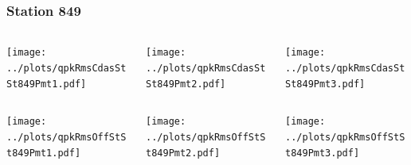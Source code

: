 \documentclass[aspectratio=169]{beamer}
\begin{document}
\begin{frame} 
  \frametitle{Station 849}
  \begin{center}
    \begin{columns}
      \begin{column}{0.33\textwidth}
        \texttt{[image: ../plots/qpkRmsCdasStSt849Pmt1.pdf]}
      \end{column}
      \begin{column}{0.33\textwidth}
        \texttt{[image: ../plots/qpkRmsCdasStSt849Pmt2.pdf]}
      \end{column}
      \begin{column}{0.33\textwidth}
        \texttt{[image: ../plots/qpkRmsCdasStSt849Pmt3.pdf]}
      \end{column}
    \end{columns}
  \end{center}

  \begin{center}
    \begin{columns}
      \begin{column}{0.33\textwidth}
        \texttt{[image: ../plots/qpkRmsOffStSt849Pmt1.pdf]}
      \end{column}
      \begin{column}{0.33\textwidth}
        \texttt{[image: ../plots/qpkRmsOffStSt849Pmt2.pdf]}
      \end{column}
      \begin{column}{0.33\textwidth}
        \texttt{[image: ../plots/qpkRmsOffStSt849Pmt3.pdf]}
      \end{column}
    \end{columns}
  \end{center}
\end{frame}
\end{document}
